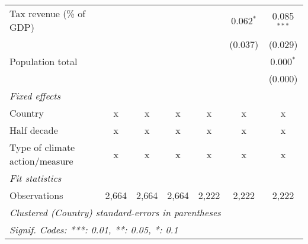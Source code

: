 \begin{tabular}{lcccccc}
   Tax revenue (\% of GDP)                                   &               &               &               &                & 0.062$^{*}$    & 0.085$^{***}$\\   
                                                             &               &               &               &                & (0.037)        & (0.029)\\   
   Population total                                          &               &               &               &                &                & 0.000$^{*}$\\   
                                                             &               &               &               &                &                & (0.000)\\   
   \emph{Fixed effects}\\
   Country                                                   & x             & x             & x             & x              & x              & x\\  
   Half decade                                               & x             & x             & x             & x              & x              & x\\  
   Type of climate action/measure                            & x             & x             & x             & x              & x              & x\\  
   \midrule \emph{Fit statistics}\\
   Observations                                              & 2,664         & 2,664         & 2,664         & 2,222          & 2,222          & 2,222\\  
   \midrule
   \multicolumn{7}{l}{\emph{Clustered (Country) standard-errors in parentheses}}\\
   \multicolumn{7}{l}{\emph{Signif. Codes: ***: 0.01, **: 0.05, *: 0.1}}\\
\end{tabular}
\par\endgroup


